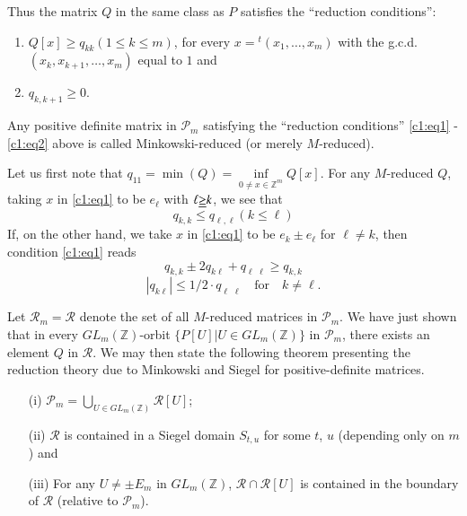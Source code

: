 Thus the matrix $Q$ in the same class as $P$ satisfies the ``reduction
conditions'': 
\begin{enumerate}
\renewcommand{\labelenumi}{(\theenumi)}
\item $Q[x]\geq q_{kk}(1\leq k\leq m)$, for every
  $x={}^{t}(x_{1},\ldots,x_{m})$ with the g.c.d.\@
  $(x_{k},x_{k+1},\ldots,x_{m})$ equal to $1$ and

\item $q_{k,k+1}\geq 0$.
\end{enumerate}

\begin{defi*}
Any positive definite matrix in $\mathscr{P}_{m}$ satisfying the
``reduction conditions'' \eqref{c1:eq1} - \eqref{c1:eq2} above is called
Minkowski-reduced (or merely $M$-reduced).
\end{defi*}

Let us first note that $q_{11}=\min (Q)=\inf\limits_{0\neq
  x\in\mathbb{Z}^{m}}Q[x]$. For any $M$-reduced $Q$, taking $x$ in
\eqref{c1:eq1} to be $e_{\ell}$ with $\ell\underline{\geq}k$, we see that
\begin{equation*}
q_{k,k}\leq q_{\ell,\ell}(k\leq \ell)\tag{14}\label{c1:eq14}
\end{equation*}
If, on the other hand, we take $x$ in \eqref{c1:eq1} to be $e_{k}\pm
e_{\ell}$ for $\ell\neq k$, then condition \eqref{c1:eq1} reads
$$
q_{k,k}\pm 2q_{k\ell}+q_{\ell \; \ell}\geq q_{k,k}
$$\pageoriginale
\ie
\begin{equation*}
|q_{k\ell}|\leq 1/2 \cdot  q_{\ell \; \ell}\quad\text{for}\quad k\neq
\ell.\tag{15}\label{c1:eq15} 
\end{equation*}

Let $\mathscr{R}_{m}=\mathscr{R}$ denote the set of all $M$-reduced
matrices in $\mathscr{P}_{m}$. We have just shown that in every
$GL_{m}(\mathbb{Z})$-orbit $\{P[U]|U\in GL_{m}(\mathbb{Z})\}$ in
$\mathscr{P}_{m}$, there exists an element $Q$ in $\mathscr{R}$. We
may then state the following theorem presenting the reduction theory
due to Minkowski and Siegel for positive-definite matrices.

\begin{subtheorem}\label{c1:thm-1.3.1}
\begin{itemize}
\item[\rm(i)] $\mathscr{P}_{m}=\bigcup\limits_{U\in
  GL_{m}(\mathbb{Z})}\mathscr{R}[U]$; 

\item[\rm(ii)] $\mathscr{R}$ is contained in a Siegel domain $S_{t,u}$
  for some $t$, $u$ (depending only on $m$) and

\item[\rm(iii)] For any $U\neq \pm E_{m}$ in $GL_{m}(\mathbb{Z})$,
  $\mathscr{R}\cap \mathscr{R}[U]$ is contained in the boundary of
  $\mathscr{R}$ (relative to $\mathscr{P}_{m}$).
\end{itemize}
\end{subtheorem}

